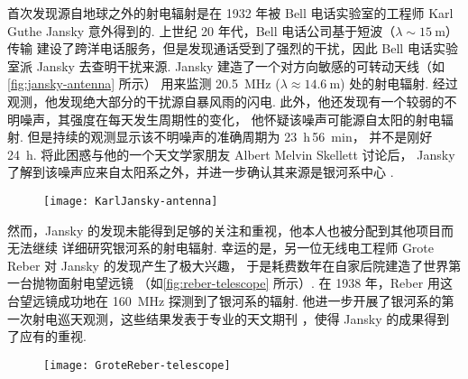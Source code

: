 首次发现源自地球之外的射电辐射是在 1932 年被 Bell 电话实验室的工程师
Karl Guthe Jansky 意外得到的.
上世纪 20 年代，Bell 电话公司基于短波（$\lambda \sim \SI{15}{\meter}$）传输
建设了跨洋电话服务，但是发现通话受到了强烈的干扰，因此 Bell 电话实验室派
Jansky 去查明干扰来源.
Jansky 建造了一个对方向敏感的可转动天线（如\autoref{fig:jansky-antenna} 所示）
用来监测 \SI{20.5}{\MHz} ($\lambda \approx \SI{14.6}{\meter}$) 处的射电辐射.
经过观测，他发现绝大部分的干扰源自暴风雨的闪电.
此外，他还发现有一个较弱的不明噪声，其强度在每天发生周期性的变化，
他怀疑该噪声可能源自太阳的射电辐射.
但是持续的观测显示该不明噪声的准确周期为 \SI{23}{\hour}\,\SI{56}{\minute}，
并不是刚好 \SI{24}{\hour}.
将此困惑与他的一个天文学家朋友 Albert Melvin Skellett 讨论后，
Jansky 了解到该噪声应来自太阳系之外，并进一步确认其来源是银河系中心 \cite{jansky1933}.

\begin{figure}[htp]
  \centering
  \texttt{[image: KarlJansky-antenna]}
  \label{fig:jansky-antenna}
\end{figure}

然而，Jansky 的发现未能得到足够的关注和重视，他本人也被分配到其他项目而无法继续
详细研究银河系的射电辐射.
幸运的是，另一位无线电工程师 Grote Reber 对 Jansky 的发现产生了极大兴趣，
于是耗费数年在自家后院建造了世界第一台抛物面射电望远镜
（如\autoref{fig:reber-telescope} 所示）.
在 1938 年，Reber 用这台望远镜成功地在 \SI{160}{\MHz} 探测到了银河系的辐射.
他进一步开展了银河系的第一次射电巡天观测，这些结果发表于专业的天文期刊
\apj \cite{reber1940}，使得 Jansky 的成果得到了应有的重视.

\begin{figure}[htp]
  \centering
  \texttt{[image: GroteReber-telescope]}
  \label{fig:reber-telescope}
\end{figure}

